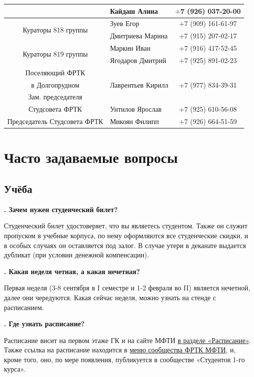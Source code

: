 \documentclass[14pt]{extarticle}
\newcounter{question}
\newcommand\Que[1]{%
    \begin{minipage}{\textwidth}
    \leavevmode\par
    \stepcounter{question}
    \noindent
    {\large\textbf{\thequestion. #1}}\par}
\newcommand\Ans[2][]{%
    \leavevmode\par\noindent
    {\leftskip37pt
    \textbf{#1}#2\par}
    \end{minipage}}
\begin{document}
\begin{center}
\begin{tabular}{ |c|l|c| }
& Кайдаш Алина & $+$7 (926) 037-20-00 \\ \hline
\multirow{2}{*}{Кураторы 818 группы}
& Зуев Егор & $+$7 (909) 161-61-97 \\ \cline{2-3}
& Дмитриева Марина & $+$7 (915) 207-02-17 \\ \hline
\multirow{2}{*}{Кураторы 819 группы}
& Маркин Иван & $+$7 (916) 417-52-45 \\ \cline{2-3}
& Ягодаров Дмитрий & $+$7 (925) 891-02-23 \\ \hline \hline
Поселяющий ФРТК &&\\ в Долгопрудном & Лаврентьев Кирилл & +7 (977) 834-39-31 \\ \hline
Зам. председателя &&\\ Студсовета ФРТК & Унтилов Ярослав & +7 (925) 610-56-08 \\ \hline
Председатель Студсовета ФРТК & Микоян Филипп & +7 (926) 664-51-59 \\
\hline
\end{tabular}
\renewcommand{\arraystretch}{1}
\end{center}
\clearpage
\section{Часто задаваемые вопросы}
\setcounter{question}{0}
\subsection{Учёба}

\Que{Зачем нужен студенческий билет?}
\Ans{Студенческий билет удостоверяет, что вы являетесь студентом. Также он служит пропуском в учебные корпуса, по нему оформляются все студенческие скидки, и в особых случаях он оставляется под залог. В случае утери в деканате выдается дубликат (при условии денежной компенсации).}


\Que{Какая неделя четная, а какая нечетная?}
\Ans{Первая неделя (3-8 сентября в I семестре и 1-2 февраля во II) является нечетной, далее они чередуются. Какая сейчас неделя, можно узнать на стенде с расписанием.}

\Que{Где узнать расписание?}
\Ans{Расписание висит на первом этаже ГК и на сайте МФТИ \href{https://mipt.ru/about/departments/uchebniy/schedule/study/}{в разделе «Расписание»}. Также ссылка на расписание находится в \href{https://vk.com/page-17708_53431659}{меню сообщества ФРТК МФТИ}, и, кроме того, оно, по мере появления, публикуется в сообществе «Студентов 1-го курса».}
\end{document}
